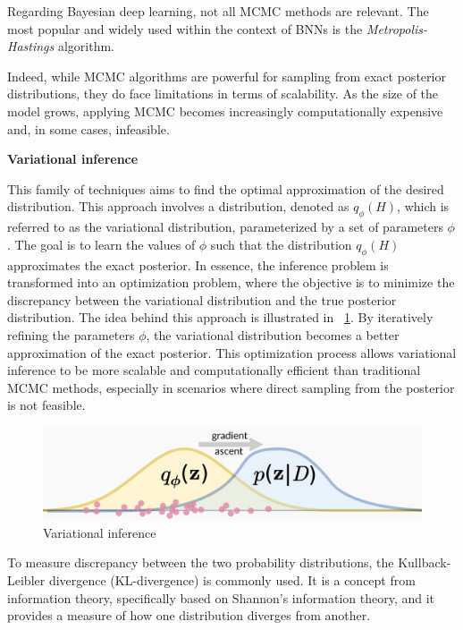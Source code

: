 Regarding Bayesian deep learning, not all MCMC methods are relevant. The most popular and widely used within the context of BNNs is the \textit{Metropolis-Hastings} algorithm.

Indeed, while MCMC algorithms are powerful for sampling from exact posterior distributions, they do face limitations in terms of scalability. As the size of the model grows, applying MCMC becomes increasingly computationally expensive and, in some cases, infeasible.

\vspace{0.2cm}
\textbf{Variational inference}

This family of techniques aims to find the optimal approximation of the desired distribution. This approach involves a distribution, denoted as $q_{\phi}(H)$, which is referred to as the variational distribution, parameterized by a set of parameters $\phi$. The goal is to learn the values of $\phi$ such that the distribution $q_{\phi}(H)$ approximates the exact posterior. In essence, the inference problem is transformed into an optimization problem, where the objective is to minimize the discrepancy between the variational distribution and the true posterior distribution. The idea behind this approach is illustrated in \Fig~\ref{fig:vi}. By iteratively refining the parameters $\phi$, the variational distribution becomes a better approximation of the exact posterior. This optimization process allows variational inference to be more scalable and computationally efficient than traditional MCMC methods, especially in scenarios where direct sampling from the posterior is not feasible.

\begin{figure}[h]
	\centering
	\includegraphics[width=0.85\linewidth]{ImageFiles/BayesianNeuralNetworks/vi}
	\caption{Variational inference \cite{VBPI}}
	\label{fig:vi}
\end{figure}

To measure discrepancy  between the two probability distributions, the Kullback-Leibler divergence (KL-divergence) is commonly used.  It is a concept from information theory, specifically based on Shannon's information theory, and it provides a measure of how one distribution diverges from another.

